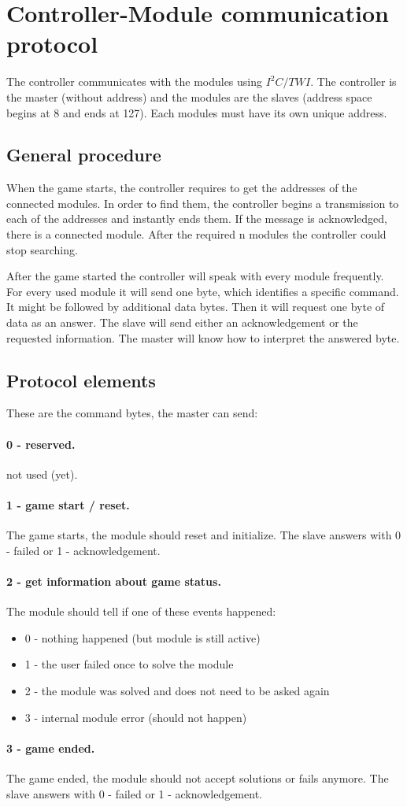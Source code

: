 \documentclass[a4paper, 12pt]{article}
\begin{document}
\section*{Controller-Module communication protocol}

The controller communicates with the modules using $I^2C/TWI$. The controller is the master (without address) and the modules are the slaves (address space begins at 8 and ends at 127). Each modules must have its own unique address.

\subsection*{General procedure}

When the game starts, the controller requires to get the addresses of the connected modules. In order to find them, the controller begins a transmission to each of the addresses and instantly ends them. If the message is acknowledged, there is a connected module. After the required n modules the controller could stop searching.

After the game started the controller will speak with every module frequently. For every used module it will send one byte, which identifies a specific command. It might be followed by additional data bytes. Then it will request one byte of data as an answer. The slave will send either an acknowledgement or the requested information. The master will know how to interpret the answered byte.

\subsection*{Protocol elements}

These are the command bytes, the master can send:

\paragraph*{0 - reserved.}
not used (yet).

\paragraph*{1 - game start / reset.}
The game starts, the module should reset and initialize. The slave answers with 0 - failed or 1 - acknowledgement.

\paragraph*{2 - get information about game status.}
The module should tell if one of these events happened:
\begin{itemize}
\setlength{\itemsep}{0pt}
\item 0 - nothing happened (but module is still active)
\item 1 - the user failed once to solve the module
\item 2 - the module was solved and does not need to be asked again
\item 3 - internal module error (should not happen)
\end{itemize}

\paragraph*{3 - game ended.}
The game ended, the module should not accept solutions or fails anymore. The slave answers with 0 - failed or 1 - acknowledgement.
\end{document}
